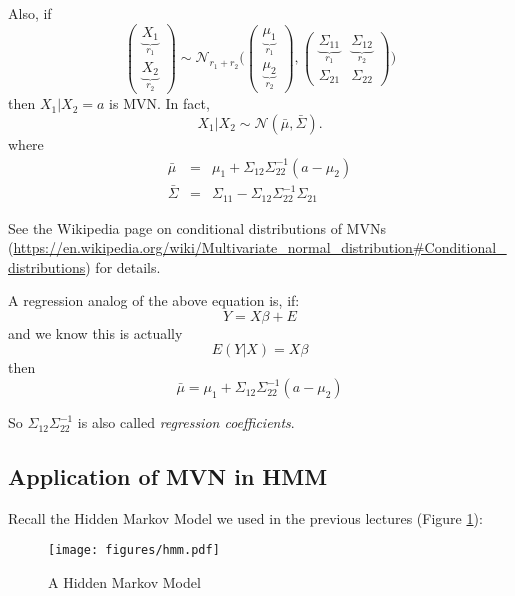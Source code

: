 \documentclass[12pt]{report}
\begin{document}
Also, if
\[
\begin{pmatrix}
    \underbrace{X_1}_{r_1} \\
    \underbrace{X_2}_{r_2}
\end{pmatrix}
\sim \mathcal{N}_{r_1 + r_2}
\Bigg(
\begin{pmatrix}
    \underbrace{\mu_1}_{r_1} \\
    \underbrace{\mu_2}_{r_2}
\end{pmatrix},
\begin{pmatrix}
    \underbrace{\Sigma_{11}}_{r_1} & \underbrace{\Sigma_{12}}_{r_2} \\
    \Sigma_{21} & \Sigma_{22}
\end{pmatrix}
\Bigg)
\]
then $X_1 | X_2 = a$ is MVN. In fact,
\begin{equation}
	X_1 | X_2 \sim \mathcal{N}(\bar{\mu}, \bar{\Sigma}).
\end{equation}
where
\begin{eqnarray}
	\bar{\mu} & = & \mu_1 + \Sigma_{12} \Sigma_{22}^{-1} (a - \mu_2)\\
	\bar{\Sigma} & = & \Sigma_{11} - \Sigma_{12} \Sigma_{22}^{-1} \Sigma_{21}
\end{eqnarray}

See the Wikipedia page on conditional distributions of MVNs (\url{https://en.wikipedia.org/wiki/Multivariate_normal_distribution#Conditional_distributions}) for details.

\vskip 0.1in

A regression analog of the above equation is, if:
\begin{equation}
	Y = X \beta + E
\end{equation}
and we know this is actually
\begin{equation}
	E(Y|X) = X \beta
\end{equation}
then 
\begin{equation}\label{mu}
	\bar{\mu} = \mu_1 + \Sigma_{12} \Sigma_{22}^{-1} (a - \mu_2)
\end{equation}

So $\Sigma_{12} \Sigma_{22}^{-1}$ is also called \emph{regression coefficients}.

\subsection{Application of MVN in HMM}

Recall the Hidden Markov Model we used in the previous lectures (Figure \ref{hmmfig}):

\begin{figure}[hbt]
  \centering
  \texttt{[image: figures/hmm.pdf]}
  \caption{A Hidden Markov Model}
  \label{hmmfig}
\end{figure}
\end{document}
